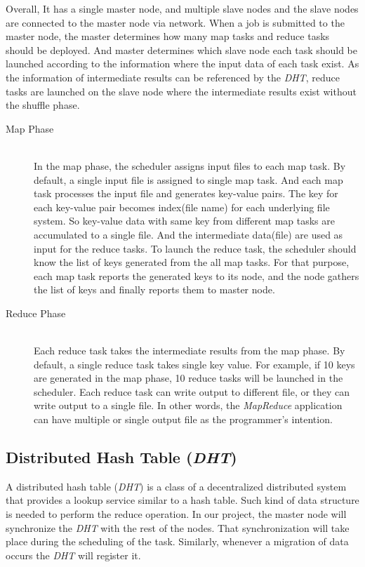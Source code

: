 \documentclass[nocopyrightspace]{sigplanconf}
\begin{document}
Overall, It has a single master node, and multiple slave nodes and the slave nodes are connected
to the master node via network. When a job is submitted to the master node, the master determines
how many map tasks and reduce tasks should be deployed. And master determines which slave node
each task should be launched according to the information where the input data of each task
exist. As the information of intermediate results can be referenced by the \textit{DHT}, reduce tasks
are launched on the slave node where the intermediate results exist without the shuffle phase.

\begin{description}
\item[Map Phase] \hfill \\
In the map phase, the scheduler assigns input files to each map task. By default,
a single input file is assigned to single map task. And each map task processes the input file and generates key-value pairs. 
The key for each key-value pair becomes index(file name) for each underlying file system. So key-value data with same key from 
different map tasks are accumulated to a single file. And the intermediate data(file) are used as input for the reduce tasks.
To launch the reduce task, the scheduler should know the list of keys generated from the all map tasks. 
For that purpose, each map task reports the generated keys to its node, and the node gathers the list of keys and finally reports them to master node.

\item[Reduce Phase] \hfill \\
Each reduce task takes the intermediate results from the map phase. By default, a single reduce 
task takes single key value. For example, if 10 keys are generated in the map phase, 10 reduce 
tasks will be launched in the scheduler. Each reduce task can write output to different file, 
or they can write output to a single file. In other words, the \textit{MapReduce} application can have 
multiple or single output file as the programmer’s intention.
\end{description}

\subsection*{Distributed Hash Table (\textit{DHT})}
A distributed hash table (\textit{DHT}) is a class of a decentralized distributed system that provides
a lookup service similar to a hash table. Such kind of data structure is needed to perform
the reduce operation. In our project, the master node will synchronize the \textit{DHT} with the rest
of the nodes. That synchronization will take place during the scheduling of the task. Similarly,
whenever a migration of data occurs the \textit{DHT} will register it. 
\end{document}
